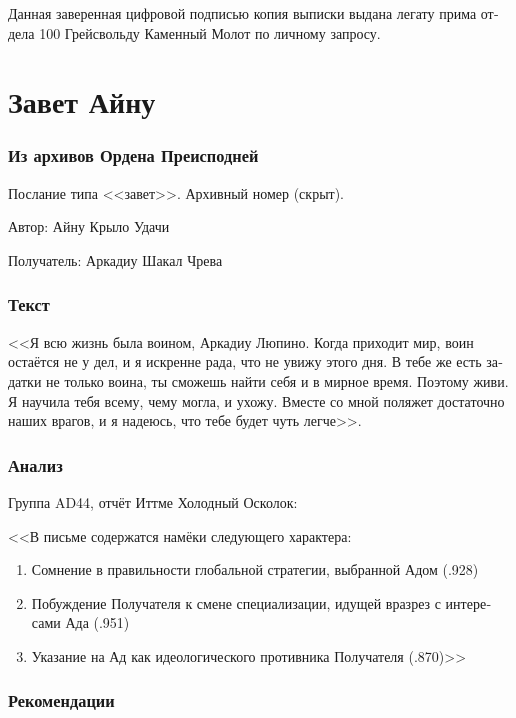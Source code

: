 \documentclass[a4paper,12pt,fleqn]{book}\usepackage{polyglossia}\setdefaultlanguage[babelshorthands=true]{russian}\setotherlanguage{english}\defaultfontfeatures{Ligatures=TeX,Mapping=tex-text}\usepackage{xcolor}\newcommand{\ml}[3]{#2}
\begin{document}
{Данная заверенная цифровой подписью копия выписки выдана легату прима отдела 100 Грейсвольду Каменный Молот по личному запросу.

\section{Завет Айну}

\subsubsection{Из архивов Ордена Преисподней}

Послание типа <<завет>>. Архивный номер (скрыт).

Автор: Айну Крыло Удачи

Получатель: Аркадиу Шакал Чрева

\subsubsection{Текст}

<<Я всю жизнь была воином, Аркадиу Люпино.
Когда приходит мир, воин остаётся не у дел, и я искренне рада, что не увижу этого дня.
В тебе же есть задатки не только воина, ты сможешь найти себя и в мирное время.
Поэтому живи.
Я научила тебя всему, чему могла, и ухожу.
Вместе со мной поляжет достаточно наших врагов, и я надеюсь, что тебе будет чуть легче>>.

\subsubsection{Анализ}

Группа AD44, отчёт Иттме Холодный Осколок:

<<В письме содержатся намёки следующего характера:

\begin{enumerate}
\item Сомнение в правильности глобальной стратегии, выбранной Адом (.928)
\item Побуждение Получателя к смене специализации, идущей вразрез с интересами Ада (.951)
\item Указание на Ад как идеологического противника Получателя (.870)>>
\end{enumerate}

\subsubsection{Рекомендации}

}
\end{document}
